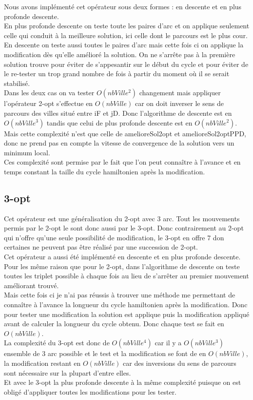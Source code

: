 \documentclass[12pt,a4paper]{article}
\begin{document}
Nous avons implémenté cet opérateur sous deux formes : en descente et en plus profonde descente.\\
En plus profonde descente on teste toute les paires d'arc et on applique seulement celle qui conduit à la meilleure solution, ici celle dont le parcours est le plus cour.\\
En descente on teste aussi toutes le paires d'arc mais cette fois ci on applique la modification dès qu'elle amélioré la solution. On ne s’arrête pas à la première solution trouve pour éviter de s'appesantir sur le début du cycle et pour éviter de le re-tester un trop grand nombre de fois à partir du moment où il se serait stabilisé.\\
Dans les deux cas on va tester $O(nbVille^2)$ changement mais appliquer l'opérateur 2-opt s’effectue en $O(nbVille)$ car on doit inverser le sens de parcours des villes situé entre iF et jD. Donc l'algorithme de descente est en $O(nbVille^3)$ tandis que celui de plus profonde descente est en $O(nbVille^2)$. Mais cette complexité n'est que celle de amelioreSol2opt et amelioreSol2optPPD, donc ne prend pas en compte la vitesse de convergence de la solution vers un minimum local.\\
Ces complexité sont permise par le fait que l'on peut connaître à l'avance et en temps constant la taille du cycle hamiltonien après la modification.
 
\subsection{3-opt}
Cet opérateur est une généralisation du 2-opt avec 3 arc. Tout les mouvements permis par le 2-opt le sont donc aussi par le 3-opt. Donc contrairement au 2-opt qui n'offre qu'une seule possibilité de modification, le 3-opt en offre 7 don certaines ne peuvent pas être réalisé par une succession de 2-opt.\\

Cet opérateur a aussi été implémenté en descente et en plus profonde descente.\\
Pour les même raison que pour le 2-opt, dans l'algorithme de descente on teste toutes les triplet possible à chaque fois au lieu de s’arrêter au premier mouvement améliorant trouvé.\\
Mais cette fois ci je n'ai pas réussis à trouver une méthode me permettant de connaître à l'avance la longueur du cycle hamiltonien après la modification. Donc pour tester une modification la solution est applique puis la modification appliqué avant de calculer la longueur du cycle obtenu. Donc chaque test se fait en $O(nbVille)$.\\
La complexité du 3-opt est donc de $O(nbVille^4)$ car il y a $O(nbVille^3)$ ensemble de 3 arc possible et le test et la modification se font de en $O(nbVille)$, la modification restant en $O(nbVille)$ car des inversions du sens de parcours sont nécessaire sur la plupart d'entre elles.\\
Et avec le 3-opt la plus profonde descente à la même complexité puisque on est obligé d'appliquer toutes les modifications pour les tester.\\
\end{document}
